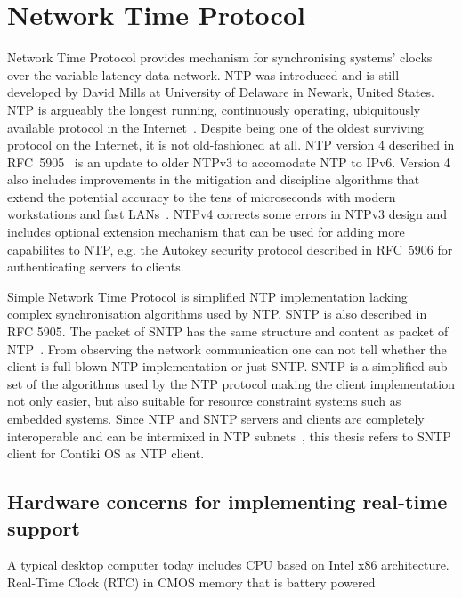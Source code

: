 
\chapter{Network Time Protocol}
Network Time Protocol provides mechanism for synchronising systems' clocks over the variable-latency data network.
NTP was introduced and is still developed by David Mills at University of Delaware in Newark, United States.
NTP is argueably the longest running, continuously operating,
ubiquitously available protocol in the Internet~\cite{ntp-overview}.
Despite being one of the oldest surviving protocol on the Internet, it is not old-fashioned at all.
NTP version 4 described in RFC~5905~\cite{rfc5905} is an update to older NTPv3 to accomodate NTP to IPv6.
Version 4 also includes improvements in
the mitigation and discipline algorithms that extend
the potential accuracy to the tens of microseconds with modern
workstations and fast LANs~\cite{rfc5905}.
NTPv4 corrects some
errors in NTPv3 design and includes optional extension mechanism
that can be used for adding more capabilites to NTP, e.g. the
Autokey security protocol described in RFC~5906
for authenticating servers to clients.

Simple Network Time Protocol is simplified NTP implementation lacking complex
synchronisation algorithms used by NTP.
SNTP is also described in RFC 5905.
The packet of SNTP has the same structure and content as packet of NTP~\cite{rfc5905}.
From observing the network communication one can not tell whether the client
is full blown NTP implementation or just SNTP.
SNTP is a simplified sub-set of the algorithms used by the NTP protocol
making the client implementation not only easier, but also suitable for
resource constraint systems such as embedded systems.
Since NTP and SNTP servers and clients are
completely interoperable and can be intermixed in NTP subnets~\cite{rfc5905},
this thesis refers to SNTP client for Contiki OS as NTP client.











\section{Hardware concerns for implementing real-time support}
A typical desktop computer today includes CPU based on Intel x86 architecture.
Real-Time Clock (RTC) in CMOS memory that is battery powered


